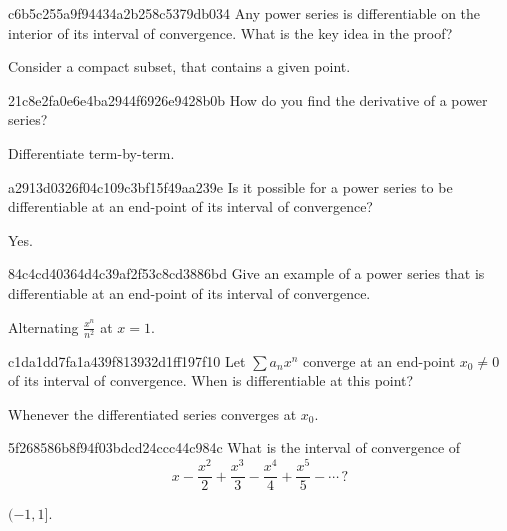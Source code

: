 \begin{note}{c6b5c255a9f94434a2b258c5379db034}
    Any power series is differentiable on the interior of its interval of convergence.
    What is the key idea in the proof?

    \begin{cloze}{1}
        Consider a compact subset, that contains a given point.
    \end{cloze}
\end{note}

\begin{note}{21c8e2fa0e6e4ba2944f6926e9428b0b}
    How do you find the derivative of a power series?

    \begin{cloze}{1}
        Differentiate term-by-term.
    \end{cloze}
\end{note}

\begin{note}{a2913d0326f04c109c3bf15f49aa239e}
    Is it possible for a power series to be differentiable at an end-point of its interval of convergence?

    \begin{cloze}{1}
        Yes.
    \end{cloze}
\end{note}

\begin{note}{84c4cd40364d4c39af2f53c8cd3886bd}
    Give an example of a power series that is differentiable at an end-point of its interval of convergence.

    \begin{cloze}{1}
        Alternating \({ \frac{x^{n}}{n^2} }\) at \({ x = 1 }\).
    \end{cloze}
\end{note}

\begin{note}{c1da1dd7fa1a439f813932d1ff197f10}
    Let \({ \sum a_n x^{n} }\) converge at an end-point \({ x_0 \neq 0 }\) of its interval of convergence.
    When is differentiable at this point?

    \begin{cloze}{1}
        Whenever the differentiated series converges at \({ x_0 }\).
    \end{cloze}
\end{note}

\begin{note}{5f268586b8f94f03bdcd24ccc44c984c}
    What is the interval of convergence of
    \[
        x - \frac{x^2}{2} + \frac{x^3}{3} - \frac{x^4}{4} + \frac{x^5}{5} - \cdots\,?
    \]

    \begin{cloze}{1}
        \({ (-1, 1] }\).
    \end{cloze}
\end{note}

